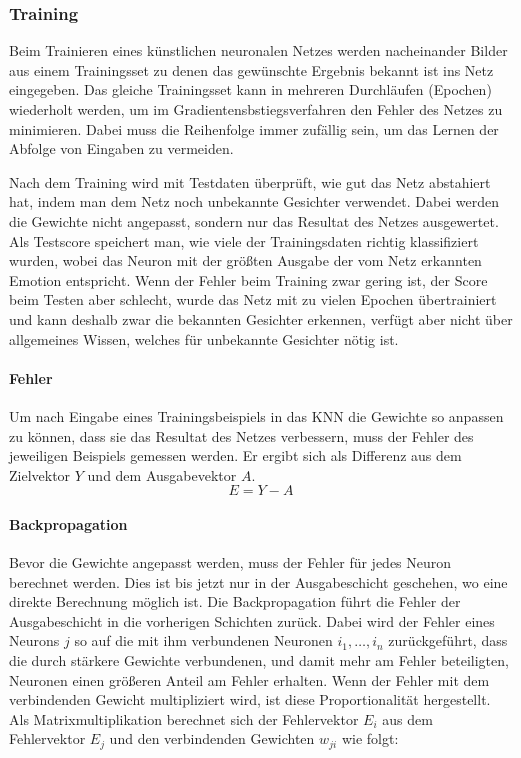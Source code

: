 \documentclass[12pt, a4paper]{article}
\begin{document}
\subsubsection{Training}
\label{training}

Beim Trainieren eines künstlichen neuronalen Netzes werden nacheinander Bilder aus einem Trainingsset zu denen das gewünschte Ergebnis bekannt ist ins Netz eingegeben. Das gleiche Trainingsset kann in mehreren Durchläufen (Epochen) wiederholt werden, um im Gradientensbstiegsverfahren den Fehler des Netzes zu minimieren. Dabei muss die Reihenfolge immer zufällig sein, um das Lernen der Abfolge von Eingaben zu vermeiden.

Nach dem Training wird mit Testdaten überprüft, wie gut das Netz abstahiert hat, indem man dem Netz noch unbekannte Gesichter verwendet. Dabei werden die Gewichte nicht angepasst, sondern nur das Resultat des Netzes ausgewertet. Als Testscore speichert man, wie viele der Trainingsdaten richtig klassifiziert wurden, wobei das Neuron mit der größten Ausgabe der vom Netz erkannten Emotion entspricht. Wenn der Fehler beim Training zwar gering ist, der Score beim Testen aber schlecht, wurde das Netz mit zu vielen Epochen übertrainiert und kann deshalb zwar die bekannten Gesichter erkennen, verfügt aber nicht über allgemeines Wissen, welches für unbekannte Gesichter nötig ist.

\paragraph{Fehler}
Um nach Eingabe eines Trainingsbeispiels in das KNN die Gewichte so anpassen zu können, dass sie das Resultat des Netzes verbessern, muss der Fehler des jeweiligen Beispiels gemessen werden. Er ergibt sich als Differenz aus dem Zielvektor \(Y\) und dem Ausgabevektor \(A\).
\[E = Y - A\]

\paragraph{Backpropagation}
Bevor die Gewichte angepasst werden, muss der Fehler für jedes Neuron berechnet werden. Dies ist bis jetzt nur in der Ausgabeschicht geschehen, wo eine direkte Berechnung möglich ist. Die Backpropagation führt die Fehler der Ausgabeschicht in die vorherigen Schichten zurück. Dabei wird der Fehler eines Neurons \(j\) so auf die mit ihm verbundenen Neuronen \(i_{1}, \dots, i_{n}\) zurückgeführt, dass die durch stärkere Gewichte verbundenen, und damit mehr am Fehler beteiligten, Neuronen einen größeren Anteil am Fehler erhalten. Wenn der Fehler mit dem verbindenden Gewicht multipliziert wird, ist diese Proportionalität hergestellt. Als Matrixmultiplikation berechnet sich der Fehlervektor \(E_{i}\) aus dem Fehlervektor \(E_{j}\) und den verbindenden Gewichten \(w_{ji}\) wie folgt:
\end{document}
